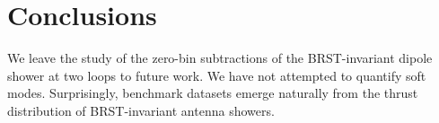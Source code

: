 \section{Conclusions}\label{sec:conclusions}

We leave the study of the zero-bin subtractions of the BRST-invariant
dipole shower at two loops to future work. We have not attempted to
quantify soft modes. Surprisingly, benchmark datasets emerge naturally
from the thrust distribution of BRST-invariant antenna showers.


